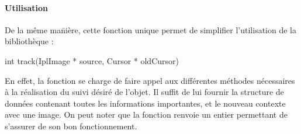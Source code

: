 \documentclass{report}
\begin{document}
						\paragraph{Utilisation}
						\begin{tabbing}\quad De la même ma\=nière, cette fonction unique permet de simplifier l'utilisation de la bibliothèque : \\
						\> \begin{itshape}int track(IplImage * source, Cursor * oldCursor)\end{itshape}
						\end{tabbing}
						\quad En effet, la fonction se charge de faire appel aux différentes méthodes nécessaires à la réalisation du suivi désiré de l'objet. Il suffit de lui fournir la structure de données contenant toutes les informations importantes, et le nouveau contexte avec une image. On peut noter que la fonction renvoie un entier permettant de s'assurer de son bon fonctionnement.
\end{document}
